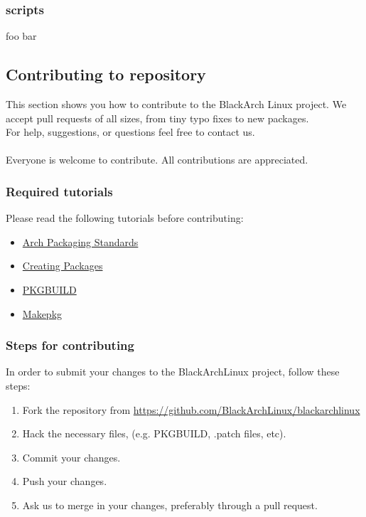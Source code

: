 \documentclass[a4paper, twoside, 11pt]{article}
\begin{document}
\subsubsection{scripts}
foo bar

\subsection{Contributing to repository}
This section shows you how to contribute to the BlackArch Linux project. We
accept pull requests of all sizes, from tiny typo fixes to new packages.\\For
help, suggestions, or questions feel free to contact us.
\\\\
Everyone is welcome to contribute. All contributions are appreciated.

\subsubsection{Required tutorials}
Please read the following tutorials before contributing:
\begin{itemize}
\item
\href{https://wiki.archlinux.org/index.php/Arch\_Packaging\_Standards)}{Arch
Packaging Standards}
\item \href{https://wiki.archlinux.org/index.php/Creating\_Packages}{Creating
Packages}
\item \href{https://wiki.archlinux.org/index.php/PKGBUILD}{PKGBUILD}
\item \href{https://wiki.archlinux.org/index.php/Makepkg}{Makepkg}
\end{itemize}

\subsubsection{Steps for contributing}
In order to submit your changes to the BlackArchLinux project, follow these
steps:
\begin{enumerate}
\item Fork the repository from
\url{https://github.com/BlackArchLinux/blackarchlinux}
\item Hack the necessary files, (e.g. PKGBUILD, .patch files, etc).
\item Commit your changes.
\item Push your changes.
\item Ask us to merge in your changes, preferably through a pull request.
\end{enumerate}
\end{document}
